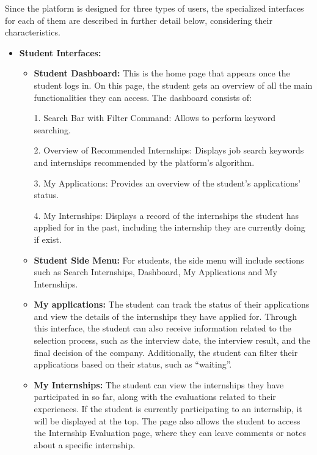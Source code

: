 Since the platform is designed for three types of users, the specialized interfaces for each of them are described in further detail
below, considering their characteristics.
\begin{itemize}
    \item \textbf{Student Interfaces:}
    \begin{itemize}
        \item \textbf{Student Dashboard:} This is the home page that appears once the student logs in. On this page, the student gets an 
        overview of all the main functionalities they can access. The dashboard consists of:

        1. Search Bar with Filter Command: Allows to perform keyword searching.
        
        2. Overview of Recommended Internships: Displays job search keywords and internships recommended by the platform's algorithm.
        
        3. My Applications: Provides an overview of the student's applications' status.
        
        4. My Internships: Displays a record of the internships the student has applied for in the past, including the internship they 
        are currently doing if exist.

        \item \textbf{Student Side Menu:} For students, the side menu will include sections such as Search Internships, Dashboard, 
        My Applications and My Internships.

        \item \textbf{My applications:} The student can track the status of their applications and view the details of the internships 
        they have applied for. Through this interface, the student can also receive information related to the selection process, such 
        as the interview date, the interview result, and the final decision of the company. Additionally, the student can filter their 
        applications based on their status, such as ``waiting''.

        \item \textbf{My Internships:} The student can view the internships they have participated in so far, along with the evaluations 
        related to their experiences. If the student is currently participating to an internship, it will be displayed at the top. The 
        page also allows the student to access the Internship Evaluation page, where they can leave comments or notes about a specific internship.


\end{itemize}
\end{itemize}
